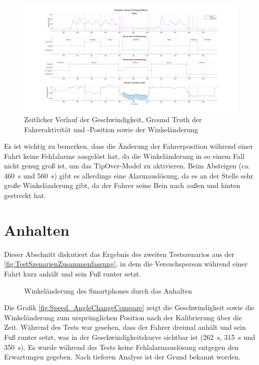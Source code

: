 \begin{figure}[H]
	\centering
	\includegraphics[width=\linewidth]{Bilder/Speed_Groundtruth_WalkStand_Compare.png}
	\caption{Zeitlicher Verlauf der Geschwindigkeit, Ground Truth der Fahreraktivität und -Position sowie der Winkeländerung}
	\label{fig:Speed_Groundtruth_WalkStand_Compare}
\end{figure}

Es ist wichtig zu bemerken, dass die Änderung der Fahrerposition während einer Fahrt keine Fehlalarme ausgelöst hat, da die Winkeländerung in so einem Fall nicht genug groß ist, um das \glqq TipOver\grqq{}-Model zu aktivieren. Beim Absteigen (ca. \SI{460}{\second} und \SI{560}{\second}) gibt es allerdings eine Alarmauslösung, da es an der Stelle sehr große Winkeländerung gibt, da der Fahrer seine Bein nach außen und hinten gestreckt hat.
\section{Anhalten}
Dieser Abschnitt diskutiert das Ergebnis des zweiten Testszenarios aus der \autoref{fig:TestSzenarienZusammenfassung}, in dem die Versuchsperson während einer Fahrt kurz anhält und sein Fuß runter setzt.

\begin{figure}
	\centering
	\caption{Winkeländerung des Smartphones durch das Anhalten}
	\label{fig:Speed_AngleChangeCompare}
\end{figure}
Die Grafik \autoref{fig:Speed_AngleChangeCompare} zeigt die Geschwindigkeit sowie die Winkeländerung zum ursprünglichen Position nach der Kalibrierung über die Zeit.
Während des Tests war gesehen, dass der Fahrer dreimal anhält und sein Fuß runter setzt, was in der Geschwindigkeitskurve sichtbar ist (\SI{262}{\second}, \SI{315}{\second} und \SI{350}{\second}). Es wurde während des Tests keine Fehlalarmauslösung entgegen den Erwartungen gegeben. Nach tieferen Analyse ist der Grund bekannt worden.

